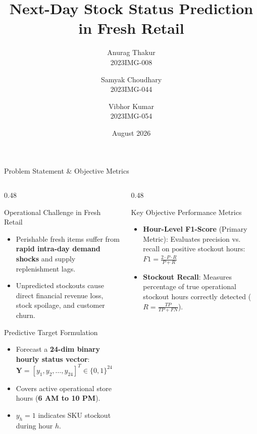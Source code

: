 \documentclass[10pt, aspectratio=169]{beamer}
\title[Next-Day Stock Status Prediction]{Next-Day Stock Status Prediction in Fresh Retail}
\author[Anurag, Samyak, Vibhor]{
  Anurag Thakur \\ \scriptsize 2023IMG-008 \and
  Samyak Choudhary \\ \scriptsize 2023IMG-044 \and
  Vibhor Kumar \\ \scriptsize 2023IMG-054
}
\institute[BTP 2026]{Department of Information Technology\\Bachelor of Technology Project (BTP)}
\date{August 2026}
\begin{document}
\begin{frame}
  \titlepage
\end{frame}

\begin{frame}{Problem Statement \& Objective Metrics}
  \small
  \begin{columns}[T]
    \begin{column}{0.48\textwidth}
      \begin{block}{Operational Challenge in Fresh Retail}
        \begin{itemize}
          \item Perishable fresh items suffer from \textbf{rapid intra-day demand shocks} and supply replenishment lags.
          \item Unpredicted stockouts cause direct financial revenue loss, stock spoilage, and customer churn.
        \end{itemize}
      \end{block}
      
      \begin{block}{Predictive Target Formulation}
        \begin{itemize}
          \item Forecast a \textbf{24-dim binary hourly status vector}:\\
            $\mathbf{Y} = [y_1, y_2, \dots, y_{24}]^T \in \{0, 1\}^{24}$
          \item Covers active operational store hours (\textbf{6 AM to 10 PM}).
          \item $y_h = 1$ indicates SKU stockout during hour $h$.
        \end{itemize}
      \end{block}
    \end{column}
    
    \begin{column}{0.48\textwidth}
      \begin{exampleblock}{Key Objective Performance Metrics}
        \begin{itemize}
          \item \textbf{Hour-Level F1-Score} (Primary Metric): Evaluates precision vs. recall on positive stockout hours: $F1 = \frac{2 \cdot P \cdot R}{P + R}$
          \item \textbf{Stockout Recall}: Measures percentage of true operational stockout hours correctly detected ($R = \frac{TP}{TP + FN}$).
        \end{itemize}
      \end{exampleblock}
    \end{column}
  \end{columns}
\end{frame}
\end{document}
